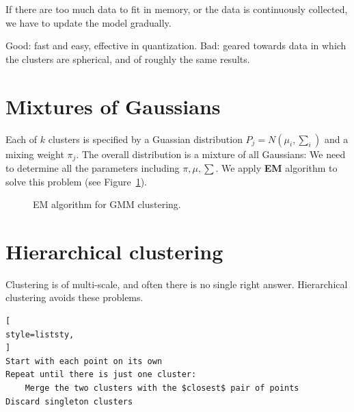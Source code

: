  If there are too much data to fit in memory, or the data
is continuously collected, we have to update the model gradually.

 Good: fast and easy, effective in quantization. Bad: geared towards data in which the clusters are spherical, and of roughly the same results.

\section{Mixtures of Gaussians} 
Each of $k$ clusters is specified by a Guassian distribution $P_j = N(\mu_i, \sum_i)$ and a mixing weight
$\pi_j$. The overall distribution is a mixture of all Gaussians:
We need to determine all the parameters including $\pi, \mu, \sum$. We apply \textbf{EM} algorithm to solve this problem
(see Figure~\ref{fig:em_mar}).
\begin{figure}[H]
	\caption{EM algorithm for GMM clustering.}
	\label{fig:em_mar}
\end{figure}

\section{Hierarchical clustering} 
Clustering is of multi-scale, and often there is no single right answer. Hierarchical 
clustering avoids these problems.
\begin{lstlisting}[
style=liststy,
]
Start with each point on its own
Repeat until there is just one cluster:
	Merge the two clusters with the $closest$ pair of points
Discard singleton clusters
\end{lstlisting}

